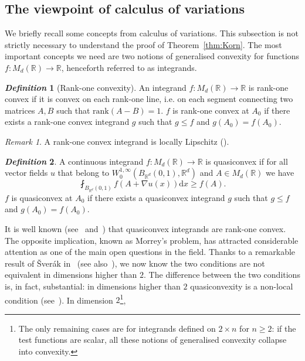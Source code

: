 \documentclass[11pt, a4paper]{amsart}
\theoremstyle{definition}
\newtheorem{definition}{\textsl{Definition}}
\theoremstyle{remark}
\newtheorem{remark}{Remark}
\newcommand{\R}{\mathbb{R}}
\begin{document}
\subsection{The viewpoint of calculus of variations}
We briefly recall some concepts from
calculus of variations. This subsection is not
strictly necessary to 
understand the proof of Theorem~\ref{thm:Korn}.
The most important 
concepts we need are
two notions of generalised convexity
for functions $f\colon M_d(\R)\to \R$,
henceforth referred to as integrands.
\begin{definition}[Rank-one convexity]
An integrand $f\colon M_{d}(\mathbb{R})\to
\mathbb{R}$ is rank-one convex
if it is convex on each rank-one line, i.e. on each 
segment connecting two matrices $A,B$ such that
$\mathrm{rank}(A-B)=1$. $f$ is rank-one convex at $A_0$
if there exists a rank-one convex integrand $g$
such that $g\le f$ and $g(A_0)=f(A_0)$.
\end{definition}
\begin{remark}
A rank-one convex integrand is locally
Lipschitz (\cite[lemma 5.6]{Rindler}).
\end{remark}
\begin{definition}
A continuous integrand $f\colon M_d(\R)\to \R$ is quasiconvex
if for all vector fields 
$u$ that belong to
$W^{1,\infty}_0(B_{\mathbb{R}^d}(0,1),
\mathbb{R}^d)$ and $A\in M_d(\R)$
we have
\begin{equation*}
\fint_{B_{\mathbb{R}^d}(0,1)}
f(A+\nabla u(x))\mathrm{d}x\ge f(A).
\end{equation*}
$f$ is quasiconvex at $A_0$ if there exists
a quasiconvex integrand $g$ such that
$g\le f$ and $g(A_0)=f(A_0)$.
\end{definition}
It is well known (see~\cite[Proposition 5.3]{Rindler}
and~\cite[Lemma 4.3]{Muller1999VariationalTransitions})
that quasiconvex integrands are rank-one convex.
The opposite implication, known as Morrey's problem,
has attracted considerable attention as one of 
the main open questions in the field.
Thanks to a remarkable result of
Šverák in~\cite{Sverak1992Rank-oneQuasiconvexity}
(see also~\cite{Grabovsky2017}), 
we now know the two conditions are not equivalent
in dimensions higher than $2$. The difference
between the two conditions is, in fact, substantial: 
in dimensions higher than $2$
quasiconvexity is a non-local condition
(see~\cite{Kristensen1999-Nonlocality}).
In dimension $2$\footnote{The only remaining 
cases are for integrands defined
on $2\times n$ for $n\ge 2$:
if the test functions are scalar,
all these notions of generalised
convexity collapse into convexity.},
\end{document}
